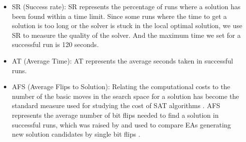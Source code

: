 \begin{itemize}
	\item
	      SR (Success rate): SR represents the percentage of runs where a solution has
	      been found within a time limit. Since some runs where the time to get a
	      solution is too long or the solver is stuck in the local optimal solution, we
	      use SR to measure the quality of the solver. And the maximum time we set for a
	      successful run is 120 seconds.
	\item
	      AT (Average Time): AT represents the average seconds taken in successful runs.
	\item
	      AFS (Average Flips to Solution): Relating the computational costs to the
	      number of the basic moves in the search space for a solution has become the
	      standard measure used for studying the cost of SAT algorithms
	      \parencite{Singer2000}. AFS represents the average number of bit flips needed
	      to find a solution in successful runs, which was raised by
	      \citeauthor{Voss} and used to compare EAs generating new solution
	      candidates by single bit flips \parencite{Voss}.
\end{itemize}
